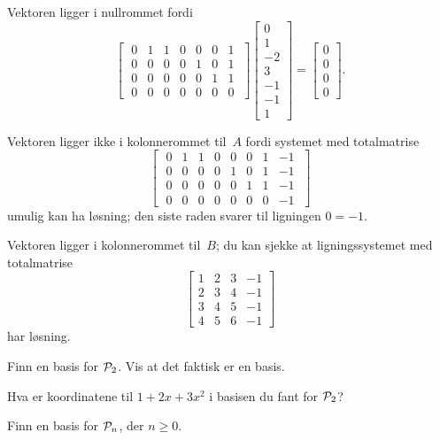 \begin{losning}
\begin{punkt}
Vektoren ligger i nullrommet fordi 
$$\begin{bmatrix}
\;0 & 1 & 1 & 0 & 0 & 0 & 1\;\\
\;0 & 0 & 0 & 0 & 1 & 0 & 1\;\\
\;0 & 0 & 0 & 0 & 0 & 1 & 1\;\\
\;0 & 0 & 0 & 0 & 0 & 0 & 0\;
\end{bmatrix}
\begin{bmatrix}
0\\
1\\
-2\\
3\\
-1\\
-1\\
1
\end{bmatrix}=
\begin{bmatrix}
0\\
0\\
0\\
0
\end{bmatrix}.
 $$
\end{punkt}

\begin{punkt}
Vektoren ligger ikke i kolonnerommet til~$A$ fordi systemet med totalmatrise 
$$
\begin{bmatrix}
\;0 & 1 & 1 & 0 & 0 & 0 & 1 & -1 \;\\
\;0 & 0 & 0 & 0 & 1 & 0 & 1 & -1 \;\\
\;0 & 0 & 0 & 0 & 0 & 1 & 1 & -1 \;\\
\;0 & 0 & 0 & 0 & 0 & 0 & 0 & -1 \;
\end{bmatrix}
$$
umulig kan ha løsning; den siste raden svarer til ligningen $0=-1$.

Vektoren ligger i kolonnerommet til~$B$; du kan sjekke at ligningssystemet med totalmatrise 
$$
\begin{bmatrix}
	1 & 2 & 3 & -1\\
	2 & 3 & 4 & -1\\
	3 & 4 & 5 & -1\\
	4 & 5 & 6 & -1
	\end{bmatrix}
$$ har løsning.
\end{punkt}

\end{losning}


\begin{oppgave}

\begin{punkt}
Finn en basis for $\P_2$. Vis at det faktisk er en basis.
\end{punkt}

\begin{punkt}
Hva er koordinatene til $1+2x+3x^2$ i basisen du fant for $\P_2$?
\end{punkt}

\begin{punkt}
Finn en basis for $\P_n$, der $n \ge 0$.
\end{punkt}

\end{oppgave}

